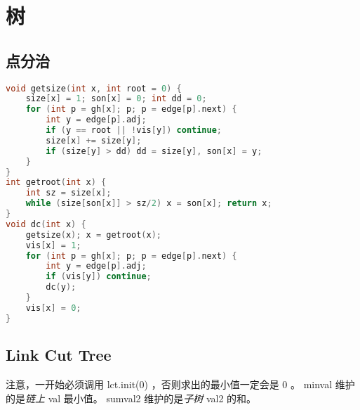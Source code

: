 \documentclass[landscape,a4paper]{article}
\begin{document}
\section{树}

\subsection{点分治}
\begin{lstlisting}[language=C++]
void getsize(int x, int root = 0) {
	size[x] = 1; son[x] = 0; int dd = 0;
	for (int p = gh[x]; p; p = edge[p].next) {
		int y = edge[p].adj;
		if (y == root || !vis[y]) continue;
		size[x] += size[y];
		if (size[y] > dd) dd = size[y], son[x] = y;
	}
}
int getroot(int x) {
	int sz = size[x];
	while (size[son[x]] > sz/2)	x = son[x]; return x;
}
void dc(int x) {
	getsize(x); x = getroot(x);
	vis[x] = 1;
	for (int p = gh[x]; p; p = edge[p].next) {
		int y = edge[p].adj;
		if (vis[y]) continue;
		dc(y);
	}
	vis[x] = 0;
}
\end{lstlisting}
\subsection{Link Cut Tree}

 注意，一开始必须调用 lct.init(0) ，否则求出的最小值一定会是 0 。
 minval 维护的是\emph{链上} val 最小值。
 sumval2 维护的是\emph{子树} val2 的和。
\end{document}
